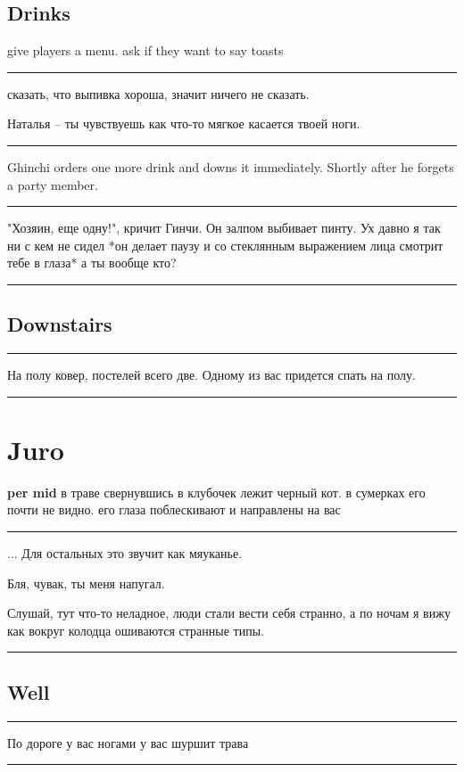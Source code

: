 \documentclass[a5paper,11pt]{book}
\newenvironment{boxed}
{\em\noindent\rule[1ex]{\linewidth}{0.1pt}\linebreak\indent}
{\par\noindent\rule[1ex]{\linewidth}{0.1pt}}
\begin{document}
\begin{multicols}{2}
\subsection{Drinks}

give players a menu. ask if they want to say toasts

\begin{boxed}
сказать, что выпивка хороша, значит ничего не сказать.

Наталья -- ты чувствуешь как что-то мягкое касается твоей ноги.
\end{boxed}

Ghinchi orders one more drink and downs it immediately. Shortly after he forgets a  party member.

\begin{boxed}
"Хозяин, еще одну!", кричит Гинчи. Он залпом выбивает пинту. Ух давно я так ни с кем не сидел *он делает паузу и со стеклянным выражением лица смотрит тебе в глаза* а ты вообще кто?
\end{boxed}

\subsection{Downstairs}

\begin{boxed}
На полу ковер, постелей всего две. Одному из вас придется спать на полу.
\end{boxed}

\section{Juro}
\textbf{per mid} в траве свернувшись в клубочек лежит черный кот. в сумерках его почти не видно. его глаза поблескивают и направлены на вас

\begin{boxed}
  ... Для остальных это звучит как мяуканье. 

  Бля, чувак, ты меня напугал.

  Слушай, тут что-то неладное, люди стали вести себя странно, а по ночам я вижу как вокруг колодца ошиваются странные типы.
\end{boxed}

\subsection{Well}
\begin{boxed}
  По дороге у вас ногами у вас шуршит трава


\end{boxed}
\end{multicols}
\end{document}
